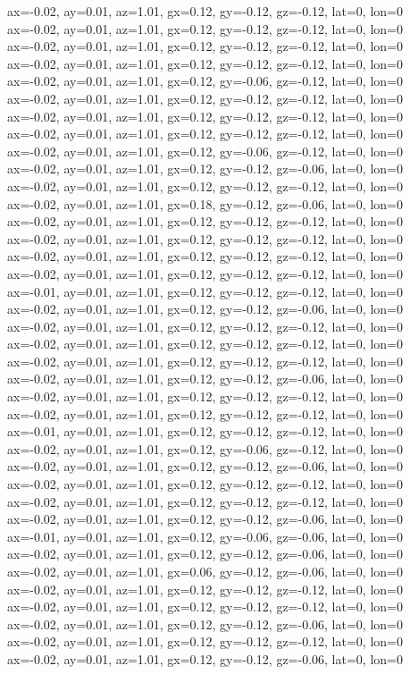 ax=-0.02, ay=0.01, az=1.01, gx=0.12, gy=-0.12, gz=-0.12, lat=0, lon=0
ax=-0.02, ay=0.01, az=1.01, gx=0.12, gy=-0.12, gz=-0.12, lat=0, lon=0
ax=-0.02, ay=0.01, az=1.01, gx=0.12, gy=-0.12, gz=-0.12, lat=0, lon=0
ax=-0.02, ay=0.01, az=1.01, gx=0.12, gy=-0.12, gz=-0.12, lat=0, lon=0
ax=-0.02, ay=0.01, az=1.01, gx=0.12, gy=-0.06, gz=-0.12, lat=0, lon=0
ax=-0.02, ay=0.01, az=1.01, gx=0.12, gy=-0.12, gz=-0.12, lat=0, lon=0
ax=-0.02, ay=0.01, az=1.01, gx=0.12, gy=-0.12, gz=-0.12, lat=0, lon=0
ax=-0.02, ay=0.01, az=1.01, gx=0.12, gy=-0.12, gz=-0.12, lat=0, lon=0
ax=-0.02, ay=0.01, az=1.01, gx=0.12, gy=-0.06, gz=-0.12, lat=0, lon=0
ax=-0.02, ay=0.01, az=1.01, gx=0.12, gy=-0.12, gz=-0.06, lat=0, lon=0
ax=-0.02, ay=0.01, az=1.01, gx=0.12, gy=-0.12, gz=-0.12, lat=0, lon=0
ax=-0.02, ay=0.01, az=1.01, gx=0.18, gy=-0.12, gz=-0.06, lat=0, lon=0
ax=-0.02, ay=0.01, az=1.01, gx=0.12, gy=-0.12, gz=-0.12, lat=0, lon=0
ax=-0.02, ay=0.01, az=1.01, gx=0.12, gy=-0.12, gz=-0.12, lat=0, lon=0
ax=-0.02, ay=0.01, az=1.01, gx=0.12, gy=-0.12, gz=-0.12, lat=0, lon=0
ax=-0.02, ay=0.01, az=1.01, gx=0.12, gy=-0.12, gz=-0.12, lat=0, lon=0
ax=-0.01, ay=0.01, az=1.01, gx=0.12, gy=-0.12, gz=-0.12, lat=0, lon=0
ax=-0.02, ay=0.01, az=1.01, gx=0.12, gy=-0.12, gz=-0.06, lat=0, lon=0
ax=-0.02, ay=0.01, az=1.01, gx=0.12, gy=-0.12, gz=-0.12, lat=0, lon=0
ax=-0.02, ay=0.01, az=1.01, gx=0.12, gy=-0.12, gz=-0.12, lat=0, lon=0
ax=-0.02, ay=0.01, az=1.01, gx=0.12, gy=-0.12, gz=-0.12, lat=0, lon=0
ax=-0.02, ay=0.01, az=1.01, gx=0.12, gy=-0.12, gz=-0.06, lat=0, lon=0
ax=-0.02, ay=0.01, az=1.01, gx=0.12, gy=-0.12, gz=-0.12, lat=0, lon=0
ax=-0.02, ay=0.01, az=1.01, gx=0.12, gy=-0.12, gz=-0.12, lat=0, lon=0
ax=-0.01, ay=0.01, az=1.01, gx=0.12, gy=-0.12, gz=-0.12, lat=0, lon=0
ax=-0.02, ay=0.01, az=1.01, gx=0.12, gy=-0.06, gz=-0.12, lat=0, lon=0
ax=-0.02, ay=0.01, az=1.01, gx=0.12, gy=-0.12, gz=-0.06, lat=0, lon=0
ax=-0.02, ay=0.01, az=1.01, gx=0.12, gy=-0.12, gz=-0.12, lat=0, lon=0
ax=-0.02, ay=0.01, az=1.01, gx=0.12, gy=-0.12, gz=-0.12, lat=0, lon=0
ax=-0.02, ay=0.01, az=1.01, gx=0.12, gy=-0.12, gz=-0.06, lat=0, lon=0
ax=-0.01, ay=0.01, az=1.01, gx=0.12, gy=-0.06, gz=-0.06, lat=0, lon=0
ax=-0.02, ay=0.01, az=1.01, gx=0.12, gy=-0.12, gz=-0.06, lat=0, lon=0
ax=-0.02, ay=0.01, az=1.01, gx=0.06, gy=-0.12, gz=-0.06, lat=0, lon=0
ax=-0.02, ay=0.01, az=1.01, gx=0.12, gy=-0.12, gz=-0.12, lat=0, lon=0
ax=-0.02, ay=0.01, az=1.01, gx=0.12, gy=-0.12, gz=-0.12, lat=0, lon=0
ax=-0.02, ay=0.01, az=1.01, gx=0.12, gy=-0.12, gz=-0.06, lat=0, lon=0
ax=-0.02, ay=0.01, az=1.01, gx=0.12, gy=-0.12, gz=-0.12, lat=0, lon=0
ax=-0.02, ay=0.01, az=1.01, gx=0.12, gy=-0.12, gz=-0.06, lat=0, lon=0
